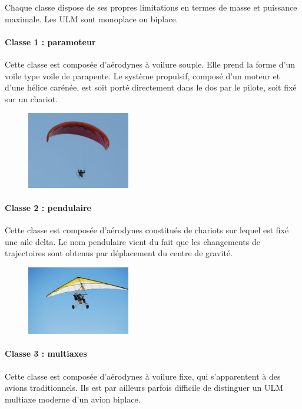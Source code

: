 Chaque classe dispose de ses propres limitations en termes de masse et puissance maximale. Les ULM sont monoplace ou biplace.

	\paragraph{Classe 1 : paramoteur}

	Cette classe est composée d'aérodynes à voilure souple. Elle prend la forme d'un voile type voile de parapente. Le système propulsif, composé d'un moteur et d'une hélice carénée, est soit porté directement dans le dos par le pilote, soit fixé sur un chariot.  
	
	\begin{figure}[H]
  	\centering
    \includegraphics[width=0.4\textwidth]{01-EtudeAeronefs/img/ULM_Classe_1.jpg}
	\end{figure}	
	
	\paragraph{Classe 2 : pendulaire}
	Cette classe est composée d'aérodynes constitués de chariots sur lequel est fixé une aile delta. Le nom pendulaire vient du fait que les changements de trajectoires sont obtenus par déplacement du centre de gravité.	
	
	\begin{figure}[H]
  	\centering
    \includegraphics[width=0.4\textwidth]{01-EtudeAeronefs/img/ULM_Classe_2.jpg}
	\end{figure}	

	\paragraph{Classe 3 : multiaxes}
	Cette classe est composée d'aérodynes à voilure fixe, qui s'apparentent à des avions traditionnels. Ils est par ailleurs parfois difficile de distinguer un ULM  multiaxe moderne d'un avion biplace.
	
